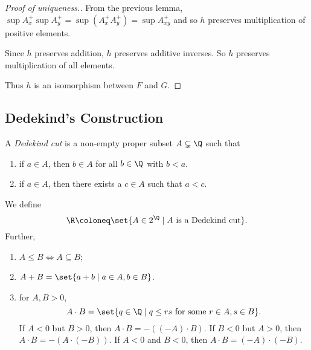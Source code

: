 \begin{proof}[Proof of uniqueness.]
\begin{minipage}{0.9\textwidth}
        From the previous lemma, $\sup A^+_x \sup A^+_y =
        \sup (A^+_x A^+_y) = \sup A^+_{xy}$ and so $h$ preserves
        multiplication of positive elements.

        Since $h$ preserves addition, $h$ preserves additive inverses.
        So $h$ preserves multiplication of all elements.
    \end{minipage}

    Thus $h$ is an isomorphism between $F$ and $G$.
\end{proof}

\subsection{Dedekind's Construction} \label{sec:R:dedekind}
\begin{definition*} \label{def:R:dedekind:cut}
    A \emph{Dedekind cut} is a non-empty proper subset $A \subsetneq \Q$
    such that
    \begin{enumerate}
        \item if $a \in A$, then $b \in A$ for all $b \in \Q$ with $b < a$.
        \item if $a \in A$, then there exists a $c \in A$ such that $a < c$.
    \end{enumerate}
\end{definition*}

\begin{definition*}[\R] \label{def:R:dedekind}
    We define \[
        \R \coloneq \set{A \in 2^\Q \mid A \text{ is a Dedekind cut}}.
    \] Further,
    \begin{enumerate}
        \item $A \le B \iff A \subseteq B$;
        \item $A + B = \set{a + b \mid a \in A, b \in B}$.
        \item for $A, B > 0$, \[
            A \cdot B = \set{q \in \Q \mid q \le rs \text{ for some }
                r \in A, s \in B}.
        \] If $A < 0$ but $B > 0$, then $A \cdot B = -((-A) \cdot B)$.
        If $B < 0$ but $A > 0$, then $A \cdot B = -(A \cdot (-B))$.
        If $A < 0$ and $B < 0$, then $A \cdot B = (-A) \cdot (-B)$.
    \end{enumerate}
\end{definition*}

